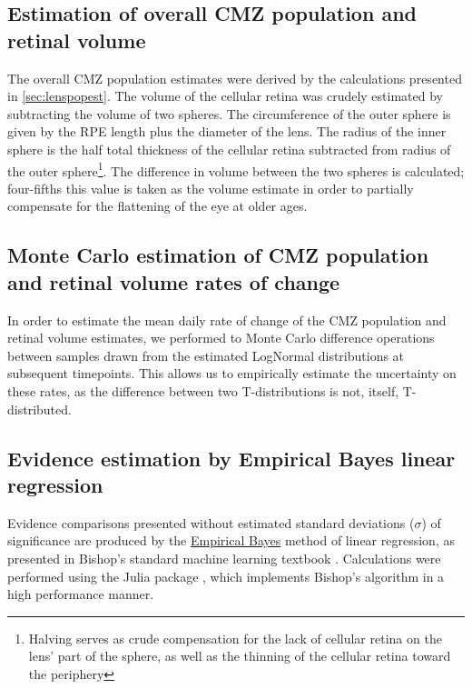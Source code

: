 \subsection{Estimation of overall CMZ population and retinal volume}
\label{ssec:CMZpopvolest}
The overall CMZ population estimates were derived by the calculations presented in \autoref{sec:lenspopest}. The volume of the cellular retina was crudely estimated by subtracting the volume of two spheres. The circumference of the outer sphere is given by the RPE length plus the diameter of the lens. The radius of the inner sphere is the half total thickness of the cellular retina subtracted from radius of the outer sphere\footnote{Halving serves as crude compensation for the lack of cellular retina on the lens' part of the sphere, as well as the thinning of the cellular retina toward the periphery}. The difference in volume between the two spheres is calculated; four-fifths this value is taken as the volume estimate in order to partially compensate for the flattening of the eye at older ages.

\subsection{Monte Carlo estimation of CMZ population and retinal volume rates of change}
\label{ssec:MCrates}
In order to estimate the mean daily rate of change of the CMZ population and retinal volume estimates, we performed to Monte Carlo difference operations between samples drawn from the estimated LogNormal distributions at subsequent timepoints. This allows us to empirically estimate the uncertainty on these rates, as the difference between two T-distributions is not, itself, T-distributed.


\subsection{Evidence estimation by Empirical Bayes linear regression}
\label{ssec:CMZEmpBayes}
Evidence comparisons presented without estimated standard deviations ($\sigma$) of significance are produced by the \hyperref[ssec:EmpiricalBayes]{Empirical Bayes} method of linear regression, as presented in Bishop's standard machine learning textbook \cite{Bishop2006}. Calculations were performed using the Julia package , which implements Bishop's algorithm in a high performance manner. 



